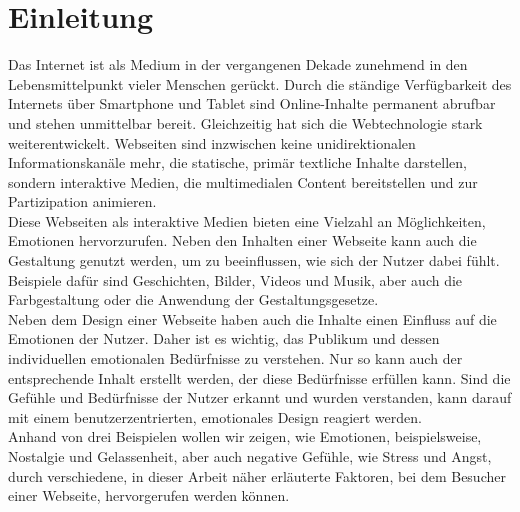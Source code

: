 \documentclass[./dokumentation.tex]{subfiles}
\begin{document}
\chapter{Einleitung}

Das Internet ist als Medium in der vergangenen Dekade zunehmend in den Lebensmittelpunkt vieler Menschen gerückt. Durch die ständige Verfügbarkeit des Internets über Smartphone und Tablet sind Online-Inhalte permanent abrufbar und stehen unmittelbar bereit. Gleichzeitig hat sich die Webtechnologie stark weiterentwickelt. Webseiten sind inzwischen keine unidirektionalen Informationskanäle mehr, die statische, primär textliche Inhalte darstellen, sondern interaktive Medien, die multimedialen Content bereitstellen und zur Partizipation animieren.\\

Diese Webseiten als interaktive Medien bieten eine Vielzahl an Möglichkeiten, Emotionen hervorzurufen. Neben den Inhalten einer Webseite kann auch die Gestaltung genutzt werden, um zu beeinflussen, wie sich der Nutzer dabei fühlt. Beispiele dafür sind Geschichten, Bilder, Videos und Musik, aber auch die Farbgestaltung oder die Anwendung der Gestaltungsgesetze.\\
Neben dem Design einer Webseite haben auch die Inhalte einen Einfluss auf die Emotionen der Nutzer. Daher ist es wichtig, das Publikum und dessen individuellen emotionalen Bedürfnisse zu verstehen. Nur so kann auch der entsprechende Inhalt erstellt werden, der diese Bedürfnisse erfüllen kann. Sind die Gefühle und Bedürfnisse der Nutzer erkannt und wurden verstanden, kann darauf mit einem benutzerzentrierten, emotionales Design reagiert werden.\\

Anhand von drei Beispielen wollen wir zeigen, wie Emotionen, beispielsweise, Nostalgie und Gelassenheit, aber auch negative Gefühle, wie Stress und Angst, durch verschiedene, in dieser Arbeit näher erläuterte Faktoren, bei dem Besucher einer Webseite, hervorgerufen werden können.\\
\end{document}
